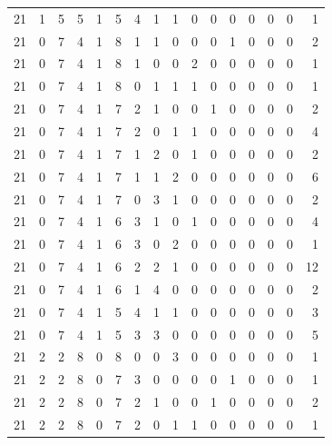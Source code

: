 \begin{appendix}
{\begin{longtable}{lrrrrrrrrrrrrrrr}
    21        & 1  & 5  & 5  & 1  & 5  & 4  & 1  & 1  & 0  & 0  & 0  & 0   & 0   & 0   & 1    \\
    21        & 0  & 7  & 4  & 1  & 8  & 1  & 1  & 0  & 0  & 0  & 1  & 0   & 0   & 0   & 2    \\
    21        & 0  & 7  & 4  & 1  & 8  & 1  & 0  & 0  & 2  & 0  & 0  & 0   & 0   & 0   & 1    \\
    21        & 0  & 7  & 4  & 1  & 8  & 0  & 1  & 1  & 1  & 0  & 0  & 0   & 0   & 0   & 1    \\
    21        & 0  & 7  & 4  & 1  & 7  & 2  & 1  & 0  & 0  & 1  & 0  & 0   & 0   & 0   & 2    \\
    21        & 0  & 7  & 4  & 1  & 7  & 2  & 0  & 1  & 1  & 0  & 0  & 0   & 0   & 0   & 4    \\
    21        & 0  & 7  & 4  & 1  & 7  & 1  & 2  & 0  & 1  & 0  & 0  & 0   & 0   & 0   & 2    \\
    21        & 0  & 7  & 4  & 1  & 7  & 1  & 1  & 2  & 0  & 0  & 0  & 0   & 0   & 0   & 6    \\
    21        & 0  & 7  & 4  & 1  & 7  & 0  & 3  & 1  & 0  & 0  & 0  & 0   & 0   & 0   & 2    \\
    21        & 0  & 7  & 4  & 1  & 6  & 3  & 1  & 0  & 1  & 0  & 0  & 0   & 0   & 0   & 4    \\
    21        & 0  & 7  & 4  & 1  & 6  & 3  & 0  & 2  & 0  & 0  & 0  & 0   & 0   & 0   & 1    \\
    21        & 0  & 7  & 4  & 1  & 6  & 2  & 2  & 1  & 0  & 0  & 0  & 0   & 0   & 0   & 12   \\
    21        & 0  & 7  & 4  & 1  & 6  & 1  & 4  & 0  & 0  & 0  & 0  & 0   & 0   & 0   & 2    \\
    21        & 0  & 7  & 4  & 1  & 5  & 4  & 1  & 1  & 0  & 0  & 0  & 0   & 0   & 0   & 3    \\
    21        & 0  & 7  & 4  & 1  & 5  & 3  & 3  & 0  & 0  & 0  & 0  & 0   & 0   & 0   & 5    \\
    21        & 2  & 2  & 8  & 0  & 8  & 0  & 0  & 3  & 0  & 0  & 0  & 0   & 0   & 0   & 1    \\
    21        & 2  & 2  & 8  & 0  & 7  & 3  & 0  & 0  & 0  & 0  & 1  & 0   & 0   & 0   & 1    \\
    21        & 2  & 2  & 8  & 0  & 7  & 2  & 1  & 0  & 0  & 1  & 0  & 0   & 0   & 0   & 2    \\
    21        & 2  & 2  & 8  & 0  & 7  & 2  & 0  & 1  & 1  & 0  & 0  & 0   & 0   & 0   & 1    \\

\end{longtable}}
\end{appendix}
